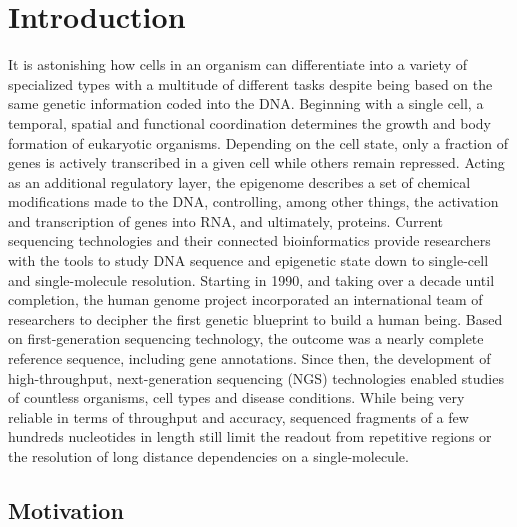 \chapter{Introduction}
\label{cha:intro}

It is astonishing how cells in an organism can differentiate into a variety of specialized types with a multitude of different tasks despite being based on the same genetic information coded into the DNA.
Beginning with a single cell, a temporal, spatial and functional coordination determines the growth and body formation of eukaryotic organisms.
Depending on the cell state, only a fraction of genes is actively transcribed in a given cell while others remain repressed.
Acting as an additional regulatory layer, the epigenome describes a set of chemical modifications made to the DNA, controlling, among other things, the activation and transcription of genes into RNA, and ultimately, proteins.
Current sequencing technologies and their connected bioinformatics provide researchers with the tools to study DNA sequence and epigenetic state down to single-cell and single-molecule resolution.
Starting in 1990, and taking over a decade until completion, the human genome project incorporated an international team of researchers to decipher the first genetic blueprint to build a human being. 
Based on first-generation sequencing technology, the outcome was a nearly complete reference sequence, including gene annotations.
Since then, the development of high-throughput, next-generation sequencing (NGS) technologies enabled studies of countless organisms, cell types and disease conditions. 
While being very reliable in terms of throughput and accuracy, sequenced fragments of a few hundreds nucleotides in length still limit the readout from repetitive regions or the resolution of long distance dependencies on a single-molecule.




\section{Motivation}
\label{sec:intro:motivation}


